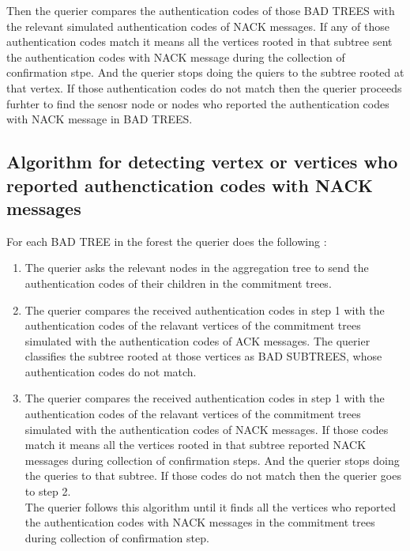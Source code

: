 Then the querier compares the authentication codes of those BAD TREES with the relevant simulated authentication codes of NACK messages. If any of those authentication codes match it means all the vertices rooted in that subtree sent the authentication codes with NACK message during the collection of confirmation stpe. And the querier stops doing the quiers to the subtree rooted at that vertex. If those authentication codes do not match then the querier proceeds furhter to find the senosr node or nodes who reported the authentication codes with NACK message in BAD TREES.\\


\subsection{Algorithm for detecting vertex or vertices who reported authenctication codes with NACK messages }

For each BAD TREE in the forest the querier does the following :

\begin{enumerate}
 
   \item 
  The querier asks the relevant nodes in the aggregation tree to send the authentication codes of their children in the commitment trees.

  \item
  The querier compares the received authentication codes in step 1 with the authentication codes of the relavant vertices of the commitment trees simulated with the authentication codes of ACK messages. The querier classifies the subtree rooted at those vertices as BAD SUBTREES, whose authentication codes do not match.

  \item 
  The querier compares the received authentication codes in step 1 with the authentication codes of the relavant vertices of the commitment trees simulated with the authentication codes of NACK messages. If those codes match it means all the vertices rooted in that subtree reported NACK messages during collection of confirmation steps. And the querier stops doing the queries to that subtree. If those codes do not match then the querier goes to step 2. \\

  The querier follows this algorithm until it finds all the vertices who reported the authentication codes with NACK messages in the commitment trees during collection of confirmation step.

\end{enumerate}




